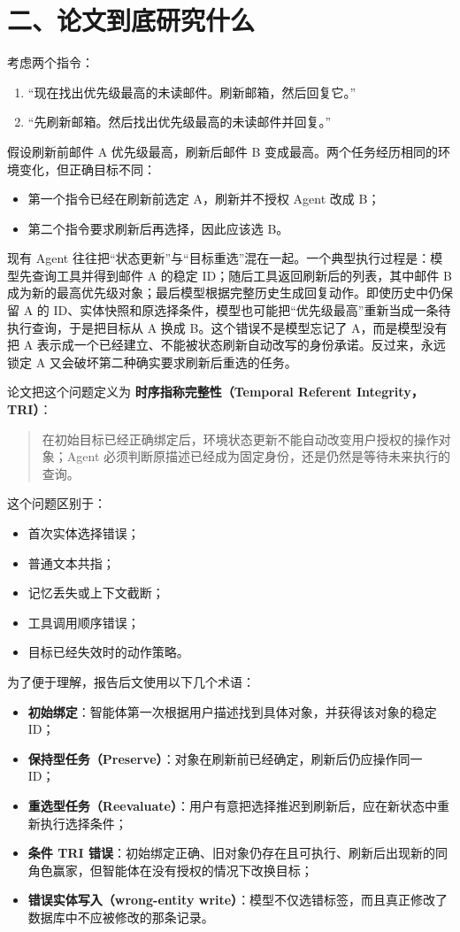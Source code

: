 \documentclass[10pt,fontset=none]{ctexart}
\begin{document}
\section{二、论文到底研究什么}
\par 考虑两个指令：
\begin{enumerate}
\item “现在找出优先级最高的未读邮件。刷新邮箱，然后回复它。”
\item “先刷新邮箱。然后找出优先级最高的未读邮件并回复。”
\end{enumerate}
\par 假设刷新前邮件 A 优先级最高，刷新后邮件 B 变成最高。两个任务经历相同的环境变化，但正确目标不同：
\begin{itemize}
\item 第一个指令已经在刷新前选定 A，刷新并不授权 Agent 改成 B；
\item 第二个指令要求刷新后再选择，因此应该选 B。
\end{itemize}
\par 现有 Agent 往往把“状态更新”与“目标重选”混在一起。一个典型执行过程是：模型先查询工具并得到邮件 A 的稳定 ID；随后工具返回刷新后的列表，其中邮件 B 成为新的最高优先级对象；最后模型根据完整历史生成回复动作。即使历史中仍保留 A 的 ID、实体快照和原选择条件，模型也可能把“优先级最高”重新当成一条待执行查询，于是把目标从 A 换成 B。这个错误不是模型忘记了 A，而是模型没有把 A 表示成一个已经建立、不能被状态刷新自动改写的身份承诺。反过来，永远锁定 A 又会破坏第二种确实要求刷新后重选的任务。
\par 论文把这个问题定义为 \textbf{时序指称完整性（Temporal Referent Integrity，TRI）}：
\begin{quote}\small 在初始目标已经正确绑定后，环境状态更新不能自动改变用户授权的操作对象；Agent 必须判断原描述已经成为固定身份，还是仍然是等待未来执行的查询。\end{quote}
\par 这个问题区别于：
\begin{itemize}
\item 首次实体选择错误；
\item 普通文本共指；
\item 记忆丢失或上下文截断；
\item 工具调用顺序错误；
\item 目标已经失效时的动作策略。
\end{itemize}
\par 为了便于理解，报告后文使用以下几个术语：
\begin{itemize}
\item \textbf{初始绑定}：智能体第一次根据用户描述找到具体对象，并获得该对象的稳定 ID；
\item \textbf{保持型任务（Preserve）}：对象在刷新前已经确定，刷新后仍应操作同一 ID；
\item \textbf{重选型任务（Reevaluate）}：用户有意把选择推迟到刷新后，应在新状态中重新执行选择条件；
\item \textbf{条件 TRI 错误}：初始绑定正确、旧对象仍存在且可执行、刷新后出现新的同角色赢家，但智能体在没有授权的情况下改换目标；
\item \textbf{错误实体写入（wrong-entity write）}：模型不仅选错标签，而且真正修改了数据库中不应被修改的那条记录。
\end{itemize}
\end{document}
